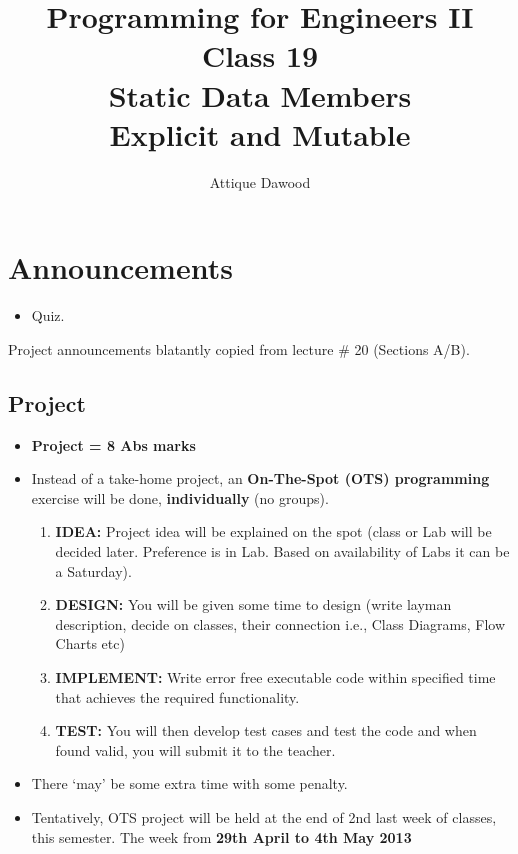 \documentclass[12pt,a4paper]{article}
\title{\vspace{-2cm}Programming for Engineers II\\Class 19\\Static Data Members\\Explicit and Mutable}
\author{Attique Dawood}
\begin{document}
\maketitle
\section{Announcements}
\begin{itemize}
\item Quiz.
\end{itemize}
Project announcements blatantly copied from lecture \# 20 (Sections A/B).
\subsection{Project}
\begin{itemize}
\item \textbf{Project = 8 Abs marks}
\item Instead of a take-home project, an \textbf{On-The-Spot (OTS) programming} exercise will be done, \textbf{individually} (no groups).
	\begin{enumerate}
	\item \textbf{IDEA:} Project idea will be explained on the spot (class or Lab will be decided later. Preference is in Lab. Based on availability of Labs it can be a Saturday).
	\item \textbf{DESIGN:} You will be given some time to design (write layman description, decide on classes, their connection i.e., Class Diagrams, Flow Charts etc)
	\item \textbf{IMPLEMENT:} Write error free executable code within specified time that achieves the required functionality.
	\item \textbf{TEST:} You will then develop test cases and test the code and when found valid, you will submit it to the teacher.
	\end{enumerate}
\item There ‘may’ be some extra time with some penalty.
\item Tentatively, OTS project will be held at the end of 2nd last week of classes, this semester. The week from \textbf{29th April to 4th May 2013}
\end{itemize}
\newpage
\end{document}
